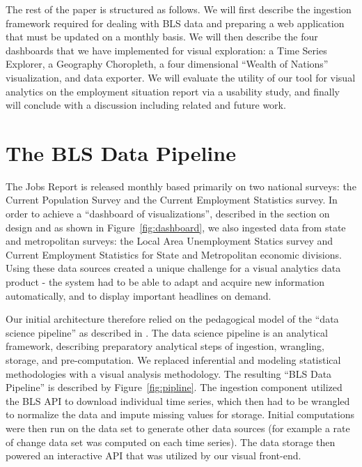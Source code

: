 \documentclass{sigchi}
\begin{document}
The rest of the paper is structured as follows. We will first describe the ingestion framework required for dealing with BLS data and preparing a web application that must be updated on a monthly basis. We will then describe the four dashboards that we have implemented for visual exploration: a Time Series Explorer, a Geography Choropleth, a four dimensional ``Wealth of Nations'' visualization, and data exporter. We will evaluate the utility of our tool for visual analytics on the employment situation report via a usability study, and finally will conclude with a discussion including related and future work.

\section{The BLS Data Pipeline}

The Jobs Report is released monthly based primarily on two national surveys: the Current Population Survey and the Current Employment Statistics survey. In order to achieve a ``dashboard of visualizations'', described in the section on design and as shown in Figure~\ref{fig:dashboard}, we also ingested data from state and metropolitan surveys: the Local Area Unemployment Statics survey and Current Employment Statistics for State and Metropolitan economic divisions. Using these data sources created a unique challenge for a visual analytics data product - the system had to be able to adapt and acquire new information automatically, and to display important headlines on demand.

Our initial architecture therefore relied on the pedagogical model of the ``data science pipeline'' as described in \cite{ojeda_practical_2014}. The data science pipeline is an analytical framework, describing preparatory analytical steps of ingestion, wrangling, storage, and pre-computation. We replaced inferential and modeling statistical methodologies with a visual analysis methodology. The resulting ``BLS Data Pipeline'' is described by Figure~\ref{fig:pipline}. The ingestion component utilized the BLS API to download individual time series, which then had to be wrangled to normalize the data and impute missing values for storage. Initial computations were then run on the data set to generate other data sources (for example a rate of change data set was computed on each time series). The data storage then powered an interactive API that was utilized by our visual front-end.
\end{document}

